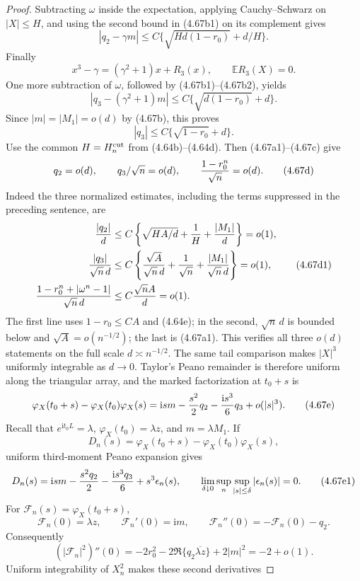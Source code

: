\documentclass[11pt,a4paper]{article}
\numberwithin{equation}{section}
\theoremstyle{definition}
\theoremstyle{remark}
\newcommand{\E}{\mathbb E}
\newcommand{\ii}{\mathrm i}
\begin{document}
\begin{proof}
Subtracting $\omega$ inside the expectation, applying Cauchy--Schwarz on
$|X|\le H$, and using the second bound in (4.67b1) on its complement
gives
\[
 |q_2-\gamma m|
 \le C\{\sqrt{Hd(1-r_0)}+d/H\}.                       \tag{4.67c}
\]
Finally
\[
 x^3-\gamma=(\gamma^2+1)x+R_3(x),\qquad \E R_3(X)=0.
\]
One more subtraction of $\omega$, followed by (4.67b1)--(4.67b2), yields
\[
 |q_3-(\gamma^2+1)m|
 \le C\{\sqrt{d(1-r_0)}+d\}.
\]
Since $|m|=|M_1|=o(d)$ by (4.67b), this proves
\[
                     |q_3|\le C\{\sqrt{1-r_0}+d\}.     \tag{4.67c1}
\]
Use the common $H=H_n^{\rm cut}$ from (4.64b)--(4.64d).  Then
(4.67a1)--(4.67c) give
\[
 q_2=o(d),\qquad q_3/\sqrt n=o(d),\qquad
 {1-r_0^n\over\sqrt n}=o(d).                         \tag{4.67d}
\]
Indeed the three normalized estimates, including the terms suppressed in
the preceding sentence, are
\[
\begin{split}
 {|q_2|\over d}
 &\le C\left\{\sqrt{HA/d}+{1\over H}+{|M_1|\over d}\right\}=o(1),\\
 {|q_3|\over\sqrt n\,d}
 &\le C\left\{{\sqrt A\over\sqrt n\,d}+{1\over\sqrt n}
               +{|M_1|\over\sqrt n\,d}\right\}=o(1),\\
 {1-r_0^n+|\omega^n-1|\over\sqrt n\,d}
 &\le C{\sqrt nA\over d}=o(1).
\end{split}                                           \tag{4.67d1}
\]
The first line uses $1-r_0\le CA$ and (4.64e); in the second,
$\sqrt n\,d$ is bounded below and $\sqrt A=o(n^{-1/2})$; the last is
(4.67a1).  This verifies all three $o(d)$ statements on the full scale
$d\asymp n^{-1/2}$.
The same tail comparison makes $|X|^3$ uniformly integrable as $d\to0$.
Taylor's Peano remainder is therefore uniform along the triangular array,
and the marked factorization at $t_0+s$ is
\[
 \varphi_X(t_0+s)-\varphi_X(t_0)\varphi_X(s)
 =\ii s m-{s^2\over2}q_2-{\ii s^3\over6}q_3+o(|s|^3). \tag{4.67e}
\]
Recall that
\(e^{\ii t_0L}=\lambda\), \(\varphi_X(t_0)=\lambda z\), and
\(m=\lambda M_1\).  If
\[
 D_n(s)=\varphi_X(t_0+s)-\varphi_X(t_0)\varphi_X(s),
\]
uniform third-moment Peano expansion gives
\[
 D_n(s)=\ii sm-{s^2q_2\over2}-{\ii s^3q_3\over6}
                     +s^3\epsilon_n(s),\qquad
 \lim_{\delta\downarrow0}\sup_n\sup_{|s|\le\delta}|\epsilon_n(s)|=0. \tag{4.67e1}
\]
For \(\mathscr F_n(s)=\varphi_X(t_0+s)\),
\[
 \mathscr F_n(0)=\lambda z,\qquad \mathscr F_n'(0)=\ii m,\qquad
 \mathscr F_n''(0)=-\mathscr F_n(0)-q_2.
\]
Consequently
\[
 (|\mathscr F_n|^2)''(0)
 =-2r_0^2-2\Re\{q_2\overline{\lambda z}\}+2|m|^2=-2+o(1).          \tag{4.67e2}
\]
Uniform integrability of \(X_n^2\) makes these second derivatives

\end{proof}
\end{document}
